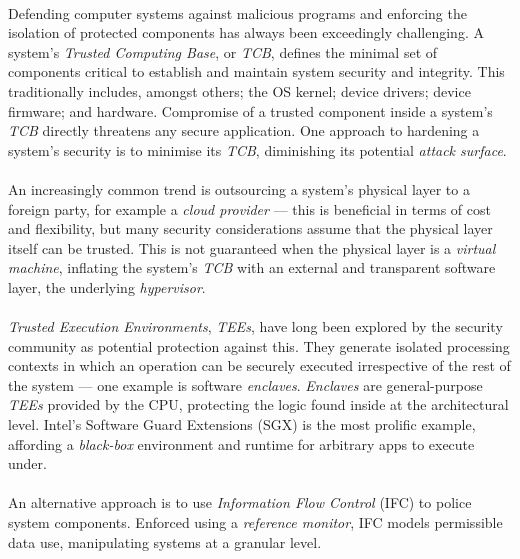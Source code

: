 


\paragraph{} Defending computer systems against malicious programs and enforcing the isolation of protected components has always been exceedingly challenging. A system's \textit{Trusted Computing Base}, or \textit{TCB}, defines the minimal set of components critical to establish and maintain system security and integrity. This traditionally includes, amongst others; the OS kernel; device drivers; device firmware; and hardware. Compromise of a trusted component inside a system's \textit{TCB} directly threatens any secure application. One approach to hardening a system's security is to minimise its \textit{TCB}, diminishing its potential \textit{attack surface}. 

\paragraph{} An increasingly common trend is outsourcing a system's physical layer to a foreign party, for example a \textit{cloud provider} --- this is beneficial in terms of cost and flexibility, but many security considerations assume that the physical layer itself can be trusted. This is not guaranteed when the physical layer is a \textit{virtual machine}, inflating the system's \textit{TCB} with an external and transparent software layer, the underlying \textit{hypervisor}.

\paragraph{} \textit{Trusted Execution Environments}, \textit{TEEs}, have long been explored by the security community as potential protection against this. They generate isolated processing contexts in which an operation can be securely executed irrespective of the rest of the system --- one example is software \textit{enclaves}. \textit{Enclaves} are general-purpose \textit{TEEs} provided by the CPU, protecting the logic found inside at the architectural level. Intel's Software Guard Extensions (SGX) is the most prolific example, affording a \textit{black-box} environment and runtime for arbitrary apps to execute under.

\paragraph{} An alternative approach is to use \textit{Information Flow Control} (IFC) to police system components. Enforced using a \textit{reference monitor}, IFC models permissible data use, manipulating systems at a granular level.


